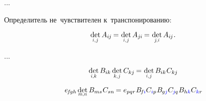 \begin{otherlanguage}{russian}
...

Определитель не~чувствителен к~транспонированию:

\nopagebreak\vspace{-0.25em}\begin{equation*}
\underset{\raisebox{.15em}{\scalebox{0.7}{$i$,$\hspace{.15ex}j$}}}{\operatorname{det}} \, A_{i\hspace{-0.1ex}j} \hspace{-0.16ex}
= \hspace{.1ex} \underset{\raisebox{.15em}{\scalebox{0.7}{$i$,$\hspace{.15ex}j$}}}{\operatorname{det}} \, A_{j\hspace{-0.06ex}i} \hspace{-0.16ex}
= \hspace{.1ex} \underset{\raisebox{.15em}{\scalebox{0.7}{$j\hspace{-0.2ex}$,$\hspace{.1ex}i$}}}{\operatorname{det}} \, A_{i\hspace{-0.1ex}j}
\hspace{.1ex} .
\end{equation*}

...


\nopagebreak\vspace{-0.2em}\begin{equation}
\underset{\raisebox{.15em}{\scalebox{0.7}{$i$,$k$}}}{\operatorname{det}} \, B_{ik} \hspace{.4ex} \underset{\raisebox{.15em}{\scalebox{0.7}{$k$,$\hspace{.15ex}j$}}}{\operatorname{det}} \, C_{kj} \hspace{-0.15ex}
= \hspace{.1ex} \underset{\raisebox{.15em}{\scalebox{0.7}{$i$,$\hspace{.15ex}j$}}}{\operatorname{det}} \, B_{ik} \hspace{.1ex} C_{kj}
\end{equation}

\[
e_{\hspace{-0.25ex}f\hspace{-0.2ex}gh} \hspace{.33ex} \underset{\raisebox{.15em}{\scalebox{0.7}{$m$,$n$}}}{\operatorname{det}} \, B_{ms} \hspace{.1ex} C_{sn} \hspace{-0.2ex}
= e_{pqr} \hspace{.1ex} B_{\hspace{-0.25ex}f\hspace{-0.1ex}\mathcolor{blue}{i}} C_{\mathcolor{blue}{i}p} \hspace{.1ex} B_{\hspace{-0.1ex}g\mathcolor{blue}{j}} C_{\hspace{-0.1ex}\mathcolor{blue}{j}\hspace{-0.1ex}q} \hspace{.1ex} B_{h\mathcolor{blue}{k}} C_{\mathcolor{blue}{k}r}
\hspace{-0.2ex}
\]


\end{otherlanguage}
